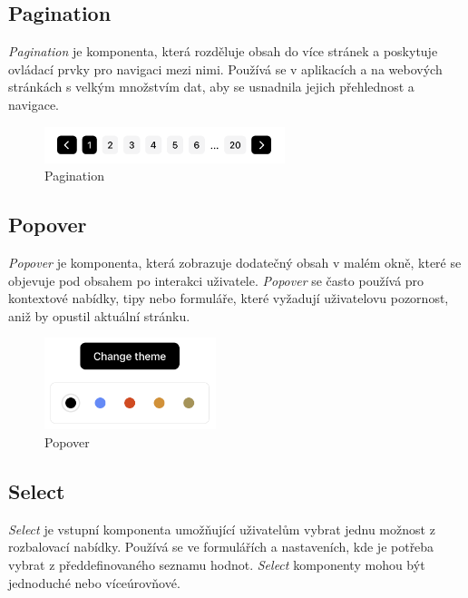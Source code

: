 \subsection{Pagination}
\emph{Pagination} je komponenta, která rozděluje obsah do více stránek a poskytuje ovládací prvky pro navigaci mezi nimi. Používá se v aplikacích a na webových stránkách s velkým množstvím dat, aby se usnadnila jejich přehlednost a navigace.

\begin{figure}[H]
  \centering
  \includegraphics[width=7cm]{images/pagination}
  \captionsetup{justification=centering,margin=2cm}
  \caption{Pagination} \label{picture:pagination}
\end{figure}

\subsection{Popover}
\emph{Popover} je komponenta, která zobrazuje dodatečný obsah v malém okně, které se objevuje pod obsahem po interakci uživatele. \emph{Popover} se často používá pro kontextové nabídky, tipy nebo formuláře, které vyžadují uživatelovu pozornost, aniž by opustil aktuální stránku.

\begin{figure}[H]
  \centering
  \includegraphics[width=5cm]{images/popover}
  \captionsetup{justification=centering,margin=2cm}
  \caption{Popover} \label{picture:popover}
\end{figure}

\subsection{Select}
\emph{Select} je vstupní komponenta umožňující uživatelům vybrat jednu možnost z rozbalovací nabídky. Používá se ve formulářích a nastaveních, kde je potřeba vybrat z předdefinovaného seznamu hodnot. \emph{Select} komponenty mohou být jednoduché nebo víceúrovňové.

